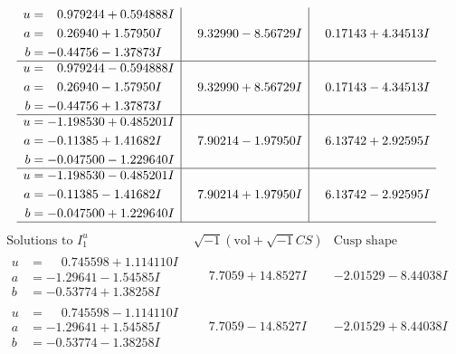 \documentclass[1p]{elsarticle_modified}
\theoremstyle{definition}
\newcommand{\I}{\sqrt{-1}}
\begin{document}
$$\begin{array}{c|c|c}
\begin{aligned}
u &= \phantom{-}0.979244 + 0.594888 I \\
a &= \phantom{-}0.26940 + 1.57950 I \\
b &= -0.44756 - 1.37873 I\end{aligned}
 & \phantom{-}9.32990 - 8.56729 I & \phantom{-}0.17143 + 4.34513 I \\ \hline\begin{aligned}
u &= \phantom{-}0.979244 - 0.594888 I \\
a &= \phantom{-}0.26940 - 1.57950 I \\
b &= -0.44756 + 1.37873 I\end{aligned}
 & \phantom{-}9.32990 + 8.56729 I & \phantom{-}0.17143 - 4.34513 I \\ \hline\begin{aligned}
u &= -1.198530 + 0.485201 I \\
a &= -0.11385 + 1.41682 I \\
b &= -0.047500 - 1.229640 I\end{aligned}
 & \phantom{-}7.90214 - 1.97950 I & \phantom{-}6.13742 + 2.92595 I \\ \hline\begin{aligned}
u &= -1.198530 - 0.485201 I \\
a &= -0.11385 - 1.41682 I \\
b &= -0.047500 + 1.229640 I\end{aligned}
 & \phantom{-}7.90214 + 1.97950 I & \phantom{-}6.13742 - 2.92595 I\\
 \hline 
 \end{array}$$\newpage$$\begin{array}{c|c|c}  
\text{Solutions to }I^u_{1}& \I (\text{vol} + \sqrt{-1}CS) & \text{Cusp shape}\\
 \hline 
\begin{aligned}
u &= \phantom{-}0.745598 + 1.114110 I \\
a &= -1.29641 - 1.54585 I \\
b &= -0.53774 + 1.38258 I\end{aligned}
 & \phantom{-}7.7059 + 14.8527 I & -2.01529 - 8.44038 I \\ \hline\begin{aligned}
u &= \phantom{-}0.745598 - 1.114110 I \\
a &= -1.29641 + 1.54585 I \\
b &= -0.53774 - 1.38258 I\end{aligned}
 & \phantom{-}7.7059 - 14.8527 I & -2.01529 + 8.44038 I \\ \hline\begin{aligned}

\end{aligned}
\end{array}$$
\end{document}
